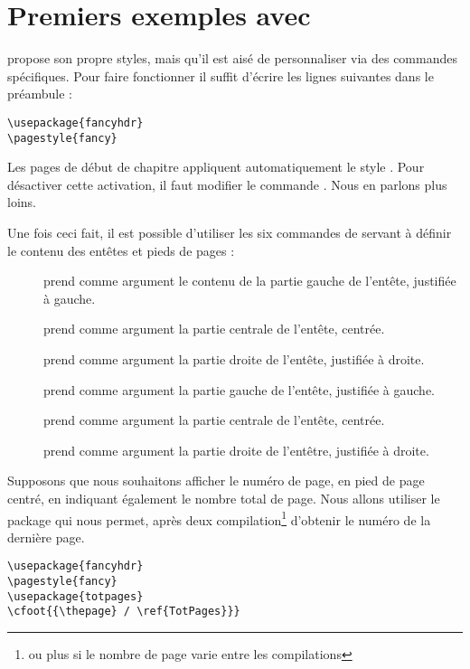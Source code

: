\section{Premiers exemples avec }

 propose son propre styles, mais qu'il est aisé de personnaliser via des commandes spécifiques. Pour faire fonctionner  il suffit d'écrire les lignes suivantes dans le préambule :
\begin{verbatim}
\usepackage{fancyhdr}
\pagestyle{fancy}
\end{verbatim}

\begin{plusloins}
Les pages de début de chapitre appliquent automatiquement le style . Pour désactiver cette activation, il faut modifier le commande . Nous en parlons plus loins. 
\end{plusloins}


Une fois ceci fait, il est possible d'utiliser les six commandes de  servant à définir le contenu des entêtes et pieds de pages :

\begin{description}
\item[]prend comme argument le contenu de la partie gauche de l'entête, justifiée à gauche.
\item[]prend comme argument la partie centrale de l'entête, centrée.
\item[]prend comme argument la partie droite de l'entête, justifiée à droite.
\item[]prend comme argument la partie gauche de l'entête, justifiée à gauche.
\item[]prend comme argument la partie centrale de l'entête, centrée.
\item[]prend comme argument la partie droite de l'entêtre, justifiée à droite.
\end{description}



Supposons que nous souhaitons afficher le numéro de page, en pied de page centré, en indiquant également le nombre total de page. Nous allons utiliser le package  qui nous permet, après deux compilation\footnote{ou plus si le nombre de page varie entre les compilations} d'obtenir le numéro de la dernière page.
\begin{verbatim}
\usepackage{fancyhdr}
\pagestyle{fancy}
\usepackage{totpages}
\cfoot{{\thepage} / \ref{TotPages}}}
\end{verbatim}

